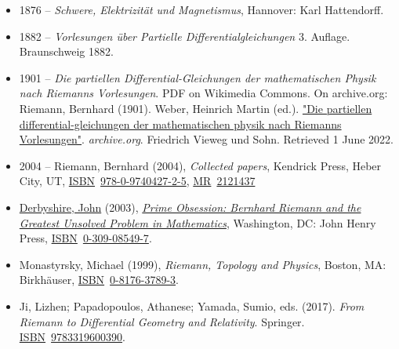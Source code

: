 \begin{itemize}
  {1876 -- \emph{Bernhard Riemann\textquotesingle s Gesammelte Mathematische Werke und wissenschaftlicher Nachlass. herausgegeben von Heinrich Weber unter Mitwirkung von Richard Dedekind}, Leipzig, B. G. Teubner 1876, 2. Auflage 1892, Nachdruck bei Dover 1953 (with contributions by Max Noether and Wilhelm Wirtinger, Teubner 1902). Later editions \emph{The collected Works of Bernhard Riemann: The Complete German Texts.} Eds. Heinrich Weber; Richard Dedekind; M Noether; Wilhelm Wirtinger; Hans Lewy. Mineola, New York: Dover Publications, Inc., 1953, 1981, 2017}
\item
  {1876 -- \emph{Schwere, Elektrizität und Magnetismus}, Hannover: Karl Hattendorff.}
\item
  {1882 -- \emph{Vorlesungen über Partielle Differentialgleichungen} 3. Auflage. Braunschweig 1882.}
\item
  {1901 -- \emph{Die partiellen Differential-Gleichungen der mathematischen Physik nach Riemann\textquotesingle s Vorlesungen}. PDF on Wikimedia Commons. On archive.org: Riemann, Bernhard (1901). Weber, Heinrich Martin (ed.). \href{https://archive.org/details/diepartiellendi02webegoog}{"Die partiellen differential-gleichungen der mathematischen physik nach Riemann\textquotesingle s Vorlesungen"}. \emph{archive.org}. Friedrich Vieweg und Sohn{. Retrieved {1 June} 2022}.{}}
\item
  {2004 -- Riemann, Bernhard (2004), \emph{Collected papers}, Kendrick Press, Heber City, UT, \href{https://en.wikipedia.org/wiki/ISBN_(identifier)}{ISBN}{~}\href{https://en.wikipedia.org/wiki/Special:BookSources/978-0-9740427-2-5}{978-0-9740427-2-5}, \href{https://en.wikipedia.org/wiki/MR_(identifier)}{MR}{~}\href{https://mathscinet.ams.org/mathscinet-getitem?mr=2121437}{2121437}{}}
\end{itemize}






\begin{itemize}
\tightlist
\item
  {\href{https://en.wikipedia.org/wiki/John_Derbyshire}{Derbyshire, John} (2003), \emph{\href{https://en.wikipedia.org/wiki/Prime_Obsession}{Prime Obsession: Bernhard Riemann and the Greatest Unsolved Problem in Mathematics}}, Washington, DC: John Henry Press, \href{https://en.wikipedia.org/wiki/ISBN_(identifier)}{ISBN}{~}\href{https://en.wikipedia.org/wiki/Special:BookSources/0-309-08549-7}{0-309-08549-7}{}.}
\item
  {Monastyrsky, Michael (1999), \emph{Riemann, Topology and Physics}, Boston, MA: Birkhäuser, \href{https://en.wikipedia.org/wiki/ISBN_(identifier)}{ISBN}{~}\href{https://en.wikipedia.org/wiki/Special:BookSources/0-8176-3789-3}{0-8176-3789-3}{}.}
\item
  {Ji, Lizhen; Papadopoulos, Athanese; Yamada, Sumio, eds. (2017). \emph{From Riemann to Differential Geometry and Relativity}. Springer. \href{https://en.wikipedia.org/wiki/ISBN_(identifier)}{ISBN}{~}\href{https://en.wikipedia.org/wiki/Special:BookSources/9783319600390}{9783319600390}.{}}
\end{itemize}



